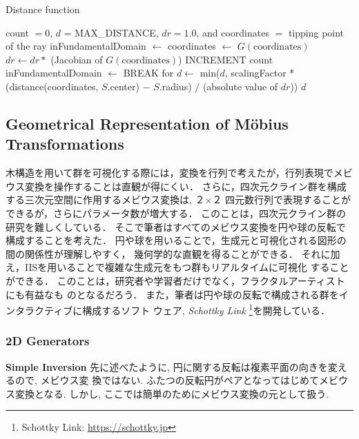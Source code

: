 \begin{algorithm}
 \caption{Distance function}
 \label{iis3d}
 \begin{algorithmic}
  \REQUIRE count $= 0$, $d$ = MAX\_DISTANCE, $dr = 1.0$, and coordinates $=$ tipping
  point of the ray
  \STATE inFundamentalDomain $\leftarrow$ \TRUE
  \STATE coordinates $\leftarrow$ $G(\text{coordinates})$
  \STATE $dr \leftarrow dr * $ (Jacobian of $G(\text{coordinates})$)
  \STATE INCREMENT count
  \STATE inFundamentalDomain $\leftarrow$ \FALSE
  \ENDIF
  \ENDFOR
  \STATE BREAK for
  \ENDIF
  \ENDFOR
  \STATE $d \leftarrow$ min($d$, scalingFactor * (distance(coordinates, $S$.center) $-$
  $S$.radius) $/$ (absolute value of $dr$))
  \ENDFOR
  \RETURN $d$
 \end{algorithmic}
\end{algorithm}

\subsection{Geometrical Representation of M\"obius Transformations}

木構造を用いて群を可視化する際には，変換を行列で考えたが，行列表現でメビ
ウス変換を操作することは直観が得にくい．
さらに，四次元クライン群を構成する三次元空間に作用するメビウス変換は, ２×２
四元数行列で表現することができるが，さらにパラメータ数が増大する．
このことは，四次元クライン群の研究を難しくしている．
そこで筆者はすべてのメビウス変換を円や球の反転で構成することを考えた．
円や球を用いることで，生成元と可視化される図形の間の関係性が理解しやすく，
幾何学的な直観を得ることができる．
それに加え，IISを用いることで複雑な生成元をもつ群もリアルタイムに可視化
することができる．
このことは，研究者や学習者だけでなく，フラクタルアーティストにも有益なも
のとなるだろう．
また，筆者は円や球の反転で構成される群をインタラクティブに構成するソフト
ウェア, {\it Schottky Link} \footnote{Schottky Link:
\url{https://schottky.jp}}を開発している．

\subsubsection{2D Generators}

\noindent\textbf{Simple Inversion}
先に述べたように, 円に関する反転は複素平面の向きを変えるので, メビウス変
換ではない.
ふたつの反転円がペアとなってはじめてメビウス変換となる.
しかし, ここでは簡単のためにメビウス変換の元として扱う.

